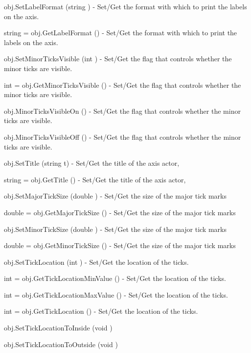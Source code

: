 \begin{DoxyItemize}
\item {\ttfamily obj.\-Set\-Label\-Format (string )} -\/ Set/\-Get the format with which to print the labels on the axis.  
\item {\ttfamily string = obj.\-Get\-Label\-Format ()} -\/ Set/\-Get the format with which to print the labels on the axis.  
\item {\ttfamily obj.\-Set\-Minor\-Ticks\-Visible (int )} -\/ Set/\-Get the flag that controls whether the minor ticks are visible.  
\item {\ttfamily int = obj.\-Get\-Minor\-Ticks\-Visible ()} -\/ Set/\-Get the flag that controls whether the minor ticks are visible.  
\item {\ttfamily obj.\-Minor\-Ticks\-Visible\-On ()} -\/ Set/\-Get the flag that controls whether the minor ticks are visible.  
\item {\ttfamily obj.\-Minor\-Ticks\-Visible\-Off ()} -\/ Set/\-Get the flag that controls whether the minor ticks are visible.  
\item {\ttfamily obj.\-Set\-Title (string t)} -\/ Set/\-Get the title of the axis actor,  
\item {\ttfamily string = obj.\-Get\-Title ()} -\/ Set/\-Get the title of the axis actor,  
\item {\ttfamily obj.\-Set\-Major\-Tick\-Size (double )} -\/ Set/\-Get the size of the major tick marks  
\item {\ttfamily double = obj.\-Get\-Major\-Tick\-Size ()} -\/ Set/\-Get the size of the major tick marks  
\item {\ttfamily obj.\-Set\-Minor\-Tick\-Size (double )} -\/ Set/\-Get the size of the major tick marks  
\item {\ttfamily double = obj.\-Get\-Minor\-Tick\-Size ()} -\/ Set/\-Get the size of the major tick marks  
\item {\ttfamily obj.\-Set\-Tick\-Location (int )} -\/ Set/\-Get the location of the ticks.  
\item {\ttfamily int = obj.\-Get\-Tick\-Location\-Min\-Value ()} -\/ Set/\-Get the location of the ticks.  
\item {\ttfamily int = obj.\-Get\-Tick\-Location\-Max\-Value ()} -\/ Set/\-Get the location of the ticks.  
\item {\ttfamily int = obj.\-Get\-Tick\-Location ()} -\/ Set/\-Get the location of the ticks.  
\item {\ttfamily obj.\-Set\-Tick\-Location\-To\-Inside (void )}  
\item {\ttfamily obj.\-Set\-Tick\-Location\-To\-Outside (void )}  

\end{DoxyItemize}
